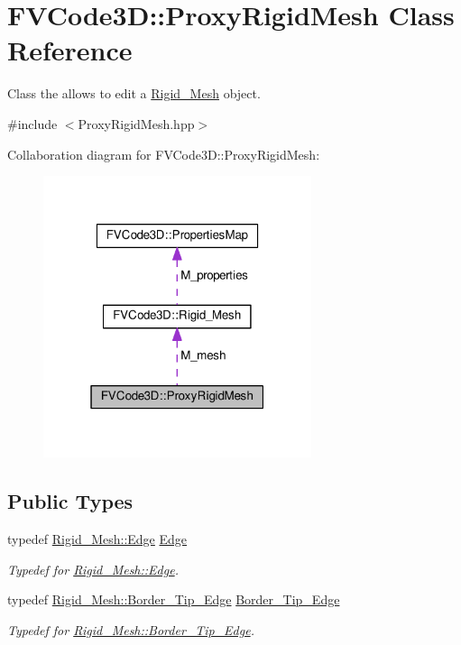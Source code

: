 \hypertarget{classFVCode3D_1_1ProxyRigidMesh}{}\section{F\+V\+Code3D\+:\+:Proxy\+Rigid\+Mesh Class Reference}
\label{classFVCode3D_1_1ProxyRigidMesh}


Class the allows to edit a \hyperlink{classFVCode3D_1_1Rigid__Mesh}{Rigid\+\_\+\+Mesh} object.  




{\ttfamily \#include $<$Proxy\+Rigid\+Mesh.\+hpp$>$}



Collaboration diagram for F\+V\+Code3D\+:\+:Proxy\+Rigid\+Mesh\+:
\nopagebreak
\begin{figure}[H]
\begin{center}
\leavevmode
\includegraphics[width=223pt]{classFVCode3D_1_1ProxyRigidMesh__coll__graph}
\end{center}
\end{figure}
\subsection*{Public Types}
\begin{DoxyCompactItemize}
\item 
typedef \hyperlink{classFVCode3D_1_1Rigid__Mesh_1_1Edge}{Rigid\+\_\+\+Mesh\+::\+Edge} \hyperlink{classFVCode3D_1_1ProxyRigidMesh_a15817669a6e426610648e6b5c9df3773}{Edge}
\begin{DoxyCompactList}\small\item\em Typedef for \hyperlink{classFVCode3D_1_1Rigid__Mesh_1_1Edge}{Rigid\+\_\+\+Mesh\+::\+Edge}. \end{DoxyCompactList}\item 
typedef \hyperlink{classFVCode3D_1_1Rigid__Mesh_1_1Border__Tip__Edge}{Rigid\+\_\+\+Mesh\+::\+Border\+\_\+\+Tip\+\_\+\+Edge} \hyperlink{classFVCode3D_1_1ProxyRigidMesh_ac258bca2012a705cb98f8b5038df0ced}{Border\+\_\+\+Tip\+\_\+\+Edge}
\begin{DoxyCompactList}\small\item\em Typedef for \hyperlink{classFVCode3D_1_1Rigid__Mesh_1_1Border__Tip__Edge}{Rigid\+\_\+\+Mesh\+::\+Border\+\_\+\+Tip\+\_\+\+Edge}. \end{DoxyCompactList}\end{DoxyCompactItemize}
